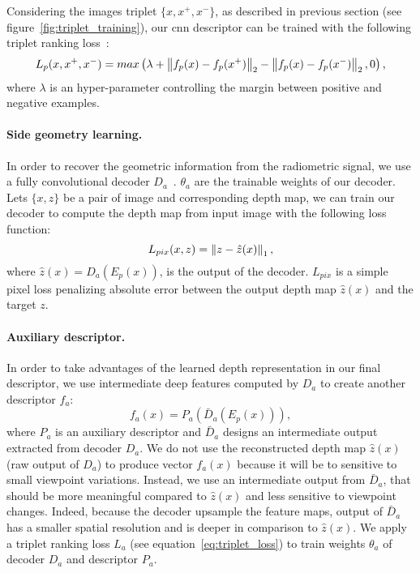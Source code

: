 Considering the images triplet $\{x, x^+, x^-\}$, as described in previous section (see figure~\ref{fig:triplet_training}), our \ac{cnn} descriptor can be trained with the following triplet ranking loss~\citep{Arandjelovic2017}:
\begin{equation}
	\label{eq:triplet_loss}
	L_p(x, x^+, x^-) = max\left(\lambda + \left\lVert f_p(x) - f_p(x^+)\right\rVert_2 - \left\lVert f_p(x) - f_p(x^-)\right\rVert_2, 0 \right),
\end{equation}
where $\lambda$ is an hyper-parameter controlling the margin between positive and negative examples.

\paragraph{Side geometry learning.}
In order to recover the geometric information from the radiometric signal, we use a fully convolutional decoder $D_a$~\citep{Eigen2014}. $\theta_{a}$ are the trainable weights of our decoder. Lets $\{x, z\}$ be a pair of image and corresponding depth map, we can train our decoder to compute the depth map from input image with the following loss function:
\begin{equation}
	\label{eq:l1_loss}
    L_{pix}(x,z) = \left\lVert z - \hat{z}(x)\right\rVert_{1},
\end{equation}
where $\hat{z}(x) = D_a(E_p(x))$, is the output of the decoder. $L_{pix}$ is a simple pixel loss penalizing absolute error between the output depth map $\hat{z}(x)$ and the target $z$.

\paragraph{Auxiliary descriptor.}
In order to take advantages of the learned depth representation in our final descriptor, we use intermediate deep features computed by $D_a$ to create another descriptor $f_a$:
\begin{equation}
	\label{eq:desc_aux}
	f_a(x) = P_a(\bar{D}_a(E_p(x))),
\end{equation}
where $P_a$ is an auxiliary descriptor and $\bar{D}_a$ designs an intermediate output extracted from decoder $D_a$. We do not use the reconstructed depth map $\hat{z}(x)$ (\ie raw output of $D_a$) to produce vector $f_a(x)$ because it will be to sensitive to small viewpoint variations. Instead, we use an intermediate output from $\bar{D}_a$, that should be more meaningful compared to  $\hat{z}(x)$ and less sensitive to viewpoint changes. Indeed, because the decoder upsample the feature maps, output of $\bar{D}_a$ has a smaller spatial resolution and is deeper in comparison to $\hat{z}(x)$. We apply a triplet ranking loss $L_a$ (see equation~\ref{eq:triplet_loss}) to train weights $\theta_{a}$ of decoder $D_a$ and descriptor $P_a$. 

